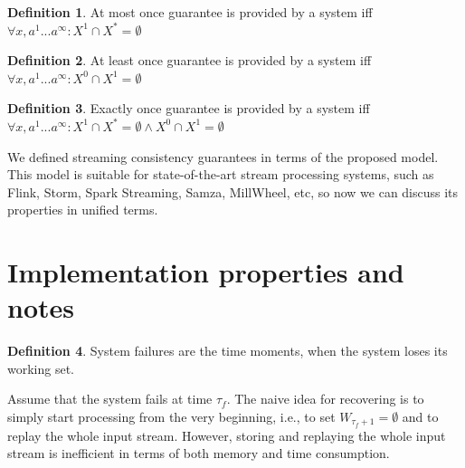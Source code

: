 \documentclass[sigconf]{acmart}
\theoremstyle{definition}
\newtheorem{definition}{Definition}
\begin{document}
\begin{definition}{At most once}
guarantee is provided by a system iff $\forall{x,a^{1}...a^\infty}:X^{1}\cap{X^{*}}=\emptyset$
\end{definition}

\begin{definition}{At least once}
guarantee is provided by a system iff $\forall{x,a^{1}...a^\infty}:X^{0}\cap{X^{1}}=\emptyset$
\end{definition}

\begin{definition}{Exactly once}
guarantee is provided by a system iff $\forall{x,a^{1}...a^\infty}:X^{1}\cap{X^{*}}=\emptyset \wedge X^{0}\cap{X^{1}}=\emptyset$
\end{definition}


We defined streaming consistency guarantees in terms of the proposed model. This model is suitable for state-of-the-art stream processing systems, such as Flink, Storm, Spark Streaming, Samza, MillWheel, etc, so now we can discuss its properties in unified terms.

\section{Implementation properties and notes}


\begin{definition}{System failures}
are the time moments, when the system loses its working set. 
\end{definition}

Assume that the system fails at time $\tau_f$. The naive idea for recovering is to simply start processing from the very beginning, i.e., to set $W_{\tau_f+1}=\emptyset$ and to replay the whole input stream. However, storing and replaying the whole input stream is inefficient in terms of both memory and time consumption.
\end{document}
